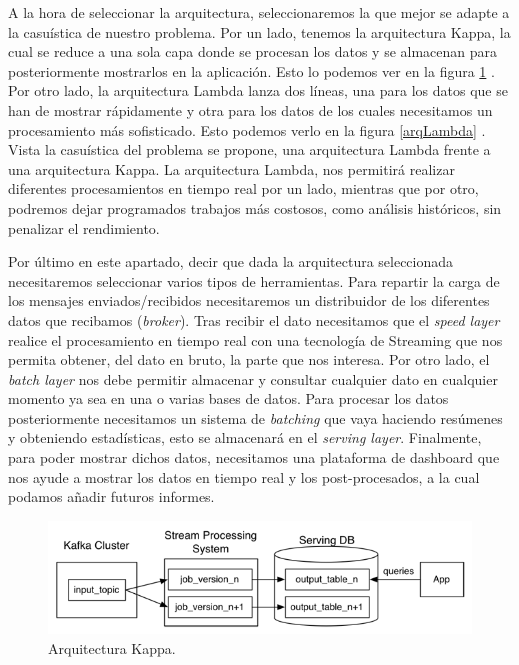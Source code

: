 A la hora de seleccionar la arquitectura, seleccionaremos la que mejor se
adapte a la casuística de nuestro problema. Por un lado, tenemos la
arquitectura Kappa, la cual se reduce a una sola capa donde se procesan los
datos y se almacenan para posteriormente mostrarlos en la aplicación. Esto
lo podemos ver en la figura \ref{arqKappa} \cite{LambdaKappa2}. Por otro
lado, la arquitectura Lambda lanza dos líneas, una para los datos que se
han de mostrar rápidamente y otra para los datos de los cuales necesitamos
un procesamiento más sofisticado. Esto podemos verlo en la figura
\ref{arqLambda} \cite{LambdaKappa}. Vista la casuística del problema se
propone, una arquitectura Lambda frente a una arquitectura Kappa. La
arquitectura Lambda, nos permitirá realizar diferentes procesamientos en
tiempo real por un lado, mientras que por otro, podremos dejar programados
trabajos más costosos, como análisis históricos, sin penalizar el
rendimiento.

Por último en este apartado, decir que dada la arquitectura seleccionada
necesitaremos seleccionar varios tipos de herramientas. Para repartir la
carga de los mensajes enviados/recibidos necesitaremos un distribuidor de
los diferentes datos que recibamos ({\em broker}). Tras recibir el dato
necesitamos que el {\em speed layer} realice el procesamiento en tiempo
real con una tecnología de Streaming que nos permita obtener,
del dato en bruto, la parte que nos interesa. Por otro lado, el {\em batch
  layer} nos debe permitir almacenar y consultar cualquier dato en
cualquier momento ya sea en una o varias bases de datos. Para procesar los
datos posteriormente necesitamos un sistema de {\em batching} que vaya
haciendo resúmenes y obteniendo estadísticas, esto se almacenará en el {\em
  serving layer}. Finalmente, para poder mostrar dichos datos, necesitamos
una plataforma de dashboard que nos ayude a mostrar los datos en tiempo
real y los post-procesados, a la cual podamos añadir futuros informes.

\begin{figure}[htp]
\centering
\includegraphics[scale=0.70]{Imagenes/arq1.png}
\caption{Arquitectura Kappa.}
\label{arqKappa}
\end{figure}


